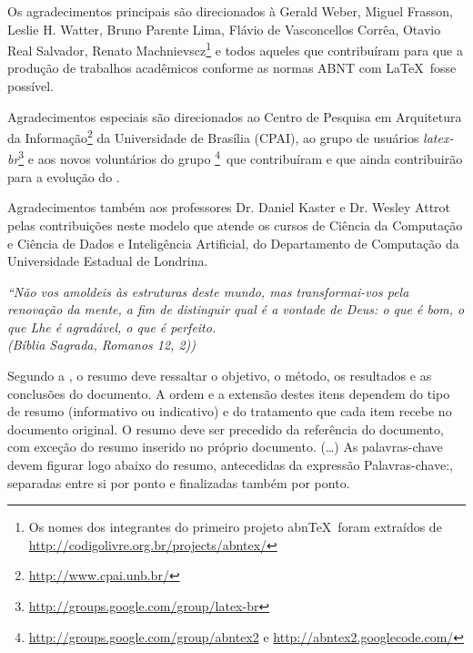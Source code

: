 \documentclass[
	12pt,				%
	openright,			%
	oneside,			%
	a4paper,			%
	tcc,			%
	]{ABNT-DC-UEL}
\begin{document}
\begin{agradecimentos}
Os agradecimentos principais são direcionados à Gerald Weber, Miguel Frasson,
Leslie H. Watter, Bruno Parente Lima, Flávio de Vasconcellos Corrêa, Otavio Real
Salvador, Renato Machnievscz\footnote{Os nomes dos integrantes do primeiro
projeto abn\TeX\ foram extraídos de
\url{http://codigolivre.org.br/projects/abntex/}} e todos aqueles que
contribuíram para que a produção de trabalhos acadêmicos conforme
as normas ABNT com \LaTeX\ fosse possível.

Agradecimentos especiais são direcionados ao Centro de Pesquisa em Arquitetura
da Informação\footnote{\url{http://www.cpai.unb.br/}} da Universidade de
Brasília (CPAI), ao grupo de usuários
\emph{latex-br}\footnote{\url{http://groups.google.com/group/latex-br}} e aos
novos voluntários do grupo
\emph{\abnTeX}\footnote{\url{http://groups.google.com/group/abntex2} e
\url{http://abntex2.googlecode.com/}}~que contribuíram e que ainda
contribuirão para a evolução do \abnTeX.

Agradecimentos também aos professores Dr. Daniel Kaster e Dr. Wesley Attrot pelas contribuições neste modelo que atende os cursos de Ciência da Computação e Ciência de Dados e Inteligência Artificial, do Departamento de Computação da Universidade Estadual de Londrina.

\end{agradecimentos}

\begin{epigrafe}
  \vspace*{\fill}
  \hspace{.4\textwidth}
  \begin{minipage}{.5\textwidth}   
    \begin{flushright}
	\textit{
    ``Não vos amoldeis às estruturas deste mundo,
      mas transformai-vos pela renovação da mente,
      a fim de distinguir qual é a vontade de Deus:
      o que é bom, o que Lhe é agradável, o que é perfeito.\\
      (Bíblia Sagrada, Romanos 12, 2))}
    \end{flushright}
  \end{minipage}
\end{epigrafe}


\begin{resumo}
 Segundo a , o resumo deve ressaltar o
 objetivo, o método, os resultados e as conclusões do documento. A ordem e a extensão
 destes itens dependem do tipo de resumo (informativo ou indicativo) e do
 tratamento que cada item recebe no documento original. O resumo deve ser
 precedido da referência do documento, com exceção do resumo inserido no
 próprio documento. (\ldots) As palavras-chave devem figurar logo abaixo do
 resumo, antecedidas da expressão Palavras-chave:, separadas entre si por
 ponto e finalizadas também por ponto.
\end{resumo}
\end{document}
